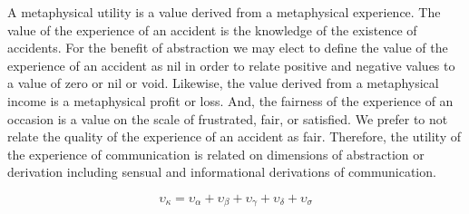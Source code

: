 

A metaphysical utility is a value derived from a metaphysical experience.  The value of the experience of an accident is the knowledge of the existence of accidents.  For the benefit of abstraction we may elect to define the value of the experience of an accident as nil in order to relate positive and negative values to a value of zero or nil or void.  Likewise, the value derived from a metaphysical income is a metaphysical profit or loss.  And, the fairness of the experience of an occasion is a value on the scale of frustrated, fair, or satisfied.  We prefer to not relate the quality of the experience of an accident as fair.  Therefore, the utility of the experience of communication is related on dimensions of abstraction or derivation including sensual and informational derivations of communication.  

$$
\upsilon_{\kappa} = \upsilon_{\alpha} + \upsilon_{\beta} + \upsilon_{\gamma} + \upsilon_{\delta} + \upsilon_{\sigma}
$$
\bye
